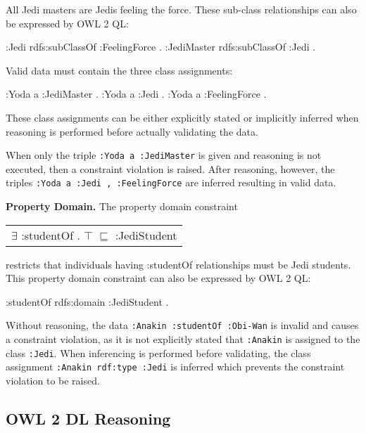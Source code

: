 \documentclass{llncs}
\newcommand{\ms}[1]{\texttt{#1}}
\newcommand{\tb}[1]{\todo[size=\small, color=green!40]{\textbf{Thomas:} #1}}
\newenvironment{DL}{
  \scriptsize
  \sffamily
  \vspace{0.3cm}
  \begin{tabular}{l}

}{
  \end{tabular}
  \linebreak
}
\begin{document}
All Jedi masters are Jedis feeling the force.
These sub-class relationships can also be expressed by OWL 2 QL:

\begin{ex}
:Jedi rdfs:subClassOf :FeelingForce . 
:JediMaster rdfs:subClassOf :Jedi . 
\end{ex}

Valid data must contain the three class assignments:

\begin{ex}
:Yoda a :JediMaster . 
:Yoda a :Jedi . 
:Yoda a :FeelingForce .
\end{ex}

These class assignments can be either explicitly stated or implicitly inferred when reasoning is performed before actually validating the data.

When only the triple \ms{:Yoda a :JediMaster} is given and reasoning is not executed, then a constraint violation is raised.
After reasoning, however, the triples \ms{:Yoda a :Jedi , :FeelingForce} are inferred resulting in valid data. 

\textbf{Property Domain.}
The property domain constraint

\begin{DL}
$\exists$ :studentOf . $\top$ $\sqsubseteq$ :JediStudent \\
\end{DL}

restricts that individuals having :studentOf relationships must be Jedi students.
This property domain constraint can also be expressed by OWL 2 QL:

\begin{ex}
:studentOf rdfs:domain :JediStudent .
\end{ex}

Without reasoning, the data \ms{:Anakin :studentOf :Obi-Wan} is invalid and causes a constraint violation, as it is not explicitly stated that \ms{:Anakin} is assigned to the class \ms{:Jedi}. 
When inferencing is performed before validating, the class assignment \ms{:Anakin rdf:type :Jedi} is inferred which prevents the constraint violation to be raised.

\subsection{OWL 2 DL Reasoning}

\end{document}
